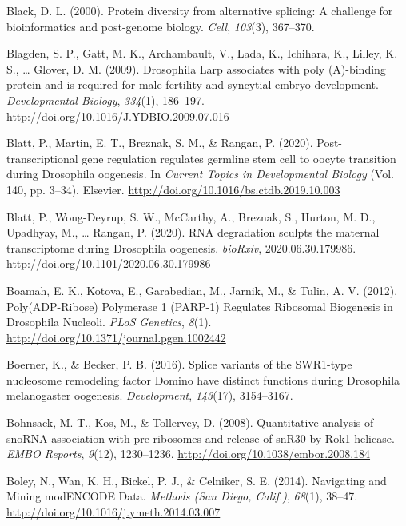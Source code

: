 \documentclass[12pt,twoside]{reedthesis}
\newlength{\cslhangindent}
\newenvironment{cslreferences}%
  {\setlength{\parindent}{0pt}%
  \everypar{\setlength{\hangindent}{\cslhangindent}}\ignorespaces}%
  {\par}
\begin{document}
\begin{cslreferences}
\leavevmode\hypertarget{ref-Black2000}{}%
Black, D. L. (2000). Protein diversity from alternative splicing: A challenge for bioinformatics and post-genome biology. \emph{Cell}, \emph{103}(3), 367--370.

\leavevmode\hypertarget{ref-Blagden2009f}{}%
Blagden, S. P., Gatt, M. K., Archambault, V., Lada, K., Ichihara, K., Lilley, K. S., \ldots{} Glover, D. M. (2009). Drosophila Larp associates with poly (A)-binding protein and is required for male fertility and syncytial embryo development. \emph{Developmental Biology}, \emph{334}(1), 186--197. \url{http://doi.org/10.1016/J.YDBIO.2009.07.016}

\leavevmode\hypertarget{ref-blattPosttranscriptionalGeneRegulation2020}{}%
Blatt, P., Martin, E. T., Breznak, S. M., \& Rangan, P. (2020). Post-transcriptional gene regulation regulates germline stem cell to oocyte transition during Drosophila oogenesis. In \emph{Current Topics in Developmental Biology} (Vol. 140, pp. 3--34). Elsevier. \url{http://doi.org/10.1016/bs.ctdb.2019.10.003}

\leavevmode\hypertarget{ref-blattRNADegradationSculpts2020}{}%
Blatt, P., Wong-Deyrup, S. W., McCarthy, A., Breznak, S., Hurton, M. D., Upadhyay, M., \ldots{} Rangan, P. (2020). RNA degradation sculpts the maternal transcriptome during Drosophila oogenesis. \emph{bioRxiv}, 2020.06.30.179986. \url{http://doi.org/10.1101/2020.06.30.179986}

\leavevmode\hypertarget{ref-boamahPolyADPRibosePolymerase2012}{}%
Boamah, E. K., Kotova, E., Garabedian, M., Jarnik, M., \& Tulin, A. V. (2012). Poly(ADP-Ribose) Polymerase 1 (PARP-1) Regulates Ribosomal Biogenesis in Drosophila Nucleoli. \emph{PLoS Genetics}, \emph{8}(1). \url{http://doi.org/10.1371/journal.pgen.1002442}

\leavevmode\hypertarget{ref-Boerner2016}{}%
Boerner, K., \& Becker, P. B. (2016). Splice variants of the SWR1-type nucleosome remodeling factor Domino have distinct functions during Drosophila melanogaster oogenesis. \emph{Development}, \emph{143}(17), 3154--3167.

\leavevmode\hypertarget{ref-bohnsackQuantitativeAnalysisSnoRNA2008}{}%
Bohnsack, M. T., Kos, M., \& Tollervey, D. (2008). Quantitative analysis of snoRNA association with pre-ribosomes and release of snR30 by Rok1 helicase. \emph{EMBO Reports}, \emph{9}(12), 1230--1236. \url{http://doi.org/10.1038/embor.2008.184}

\leavevmode\hypertarget{ref-boleyNavigatingMiningModENCODE2014}{}%
Boley, N., Wan, K. H., Bickel, P. J., \& Celniker, S. E. (2014). Navigating and Mining modENCODE Data. \emph{Methods (San Diego, Calif.)}, \emph{68}(1), 38--47. \url{http://doi.org/10.1016/j.ymeth.2014.03.007}


\end{cslreferences}
\end{document}
